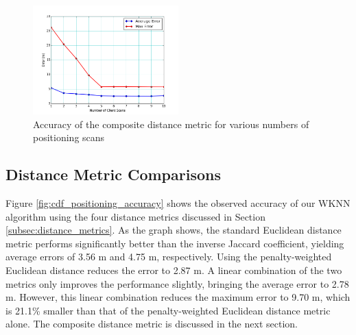 \documentclass[conference]{IEEEtran}
\begin{document}
\begin{figure}[t!]
  \centering
    \includegraphics[width=0.5\textwidth]{pull_errors.png}
   \caption{Accuracy of the composite distance metric for various numbers of positioning scans}
   \label{fig:composite_accuracy}
\end{figure}

\subsection{Distance Metric Comparisons}
Figure \ref{fig:cdf_positioning_accuracy} shows the observed accuracy of our WKNN algorithm using the four distance metrics discussed in Section \ref{subsec:distance_metrics}. As the graph shows, the standard Euclidean distance metric performs significantly better than the inverse Jaccard coefficient, yielding average errors of 3.56 m and 4.75 m, respectively. Using the penalty-weighted Euclidean distance reduces the error to 2.87 m. A linear combination of the two metrics only improves the performance slightly, bringing the average error to 2.78 m. However, this linear combination reduces the maximum error to 9.70 m, which is 21.1\% smaller than that of the penalty-weighted Euclidean distance metric alone. The composite distance metric is discussed in the next section.

\begin{table}[t!]
\renewcommand{\arraystretch}{1.3}
\caption{Distance Metric Accuracy}
\label{tab:table_distance_metric_accuracy}
\centering
{}
\end{table}
\end{document}
